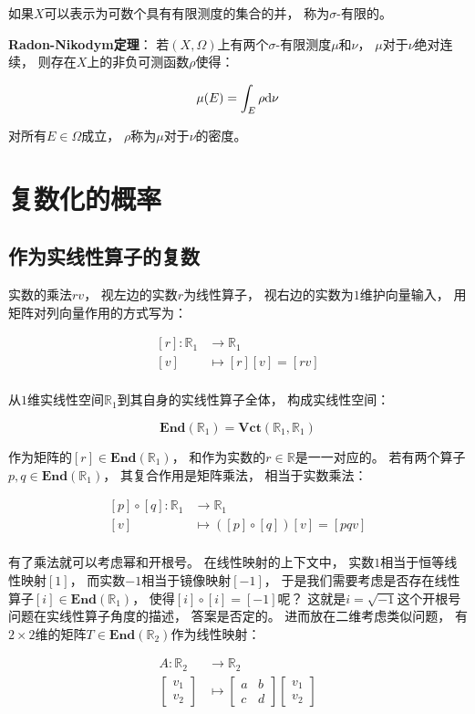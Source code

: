 \documentclass[10pt, openany]{book}
\begin{document}
如果$X$可以表示为可数个具有有限测度的集合的并，
称为$\sigma$-有限的。

\textbf{Radon-Nikodym定理}：
若$(X,\Omega)$上有两个$\sigma$-有限测度$\mu$和$\nu$，
$\mu$对于$\nu$绝对连续，
则存在$X$上的非负可测函数$\rho$使得：

$$
\mu(E) = \int_E \rho \text d \nu
$$

对所有$E\in\Omega$成立，
$\rho$称为$\mu$对于$\nu$的密度。

\chapter{复数化的概率}

\section{作为实线性算子的复数}

实数的乘法$rv$，
视左边的实数$r$为线性算子，
视右边的实数为$1$维护向量输入，
用矩阵对列向量作用的方式写为：

$$
\begin{aligned}
[r]: \mathbb R_1 &\to \mathbb R_1 \\
[v] &\mapsto [r] [v] = [rv] \\  
\end{aligned}
$$

从$1$维实线性空间$\mathbb R_1$到其自身的实线性算子全体，
构成实线性空间：

$$
\textbf{End}(\mathbb R_1) = \textbf{Vct}(\mathbb R_1,\mathbb R_1)
$$

作为矩阵的$[r]\in\textbf{End}(\mathbb R_1)$，
和作为实数的$r\in\mathbb R$是一一对应的。
若有两个算子$p,q\in \textbf{End}(\mathbb R_1)$，
其复合作用是矩阵乘法，
相当于实数乘法：

$$
\begin{aligned}
[p] \circ [q]: \mathbb R_1 &\to \mathbb R_1 \\
[v] &\mapsto ([p] \circ [q]) [v] = [pqv] \\  
\end{aligned}
$$

有了乘法就可以考虑幂和开根号。
在线性映射的上下文中，
实数$1$相当于恒等线性映射$[1]$，
而实数$-1$相当于镜像映射$[-1]$，
于是我们需要考虑是否存在线性算子$[i]\in\textbf{End}(\mathbb R_1)$，
使得$[i] \circ [i] = [-1]$呢？
这就是$i = \sqrt{-1}$这个开根号问题在实线性算子角度的描述，
答案是否定的。
进而放在二维考虑类似问题，
有$2\times 2$维的矩阵$T\in\textbf{End}(\mathbb R_2)$作为线性映射：

$$
\begin{aligned}
A: \mathbb R_2 &\to \mathbb R_2 \\
\begin{bmatrix}v_1\\v_2\end{bmatrix} &\mapsto 
\begin{bmatrix}a & b\\c & d\end{bmatrix} \begin{bmatrix}v_1\\v_2\end{bmatrix} \\  
\end{aligned}
$$
\end{document}
